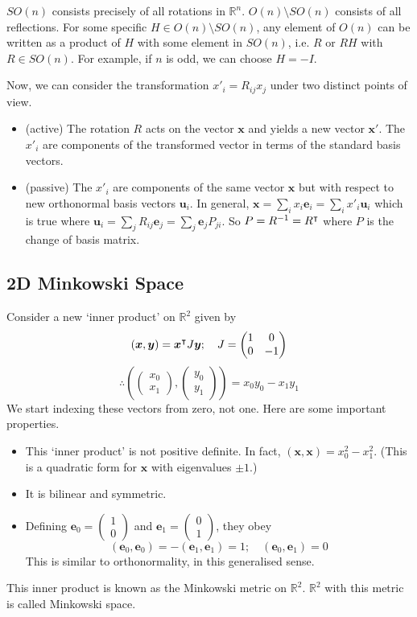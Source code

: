 \documentclass{article}
\begin{document}
	$SO(n)$ consists precisely of all rotations in $\mathbb R^n$. $O(n) \setminus SO(n)$ consists of all reflections. For some specific $H \in O(n) \setminus SO(n)$, any element of $O(n)$ can be written as a product of $H$ with some element in $SO(n)$, i.e. $R$ or $RH$ with $R \in SO(n)$. For example, if $n$ is odd, we can choose $H = -I$.

	Now, we can consider the transformation $x'_i = R_{ij} x_j$ under two distinct points of view.
	\begin{itemize}
		\item (active) The rotation $R$ acts on the vector $\bm x$ and yields a new vector $\bm x'$. The $x'_i$ are components of the transformed vector in terms of the standard basis vectors.
		\item (passive) The $x'_i$ are components of the same vector $\bm x$ but with respect to new orthonormal basis vectors $\bm u_i$. In general, $\bm x = \sum_i x_i \bm e_i = \sum_i x'_i \bm u_i$ which is true where $\bm u_i = \sum_j R_{ij} \bm e_j = \sum_j \bm e_j P_{ji}$. So $P = R^{-1} = R^\intercal$ where $P$ is the change of basis matrix.
	\end{itemize}

	\subsection{2D Minkowski Space}
	Consider a new `inner product' on $\mathbb R^2$ given by
	\[ (\bm x, \bm y) = \bm x^\intercal J \bm y;\quad J = \begin{pmatrix}
		1 & 0 \\ 0 & -1
	\end{pmatrix} \]
	\[ \therefore \left( \begin{pmatrix}
		x_0 \\ x_1
	\end{pmatrix}, \begin{pmatrix}
		y_0 \\ y_1
	\end{pmatrix} \right) = x_0 y_0 - x_1 y_1 \]
	We start indexing these vectors from zero, not one. Here are some important properties.
	\begin{itemize}
		\item This `inner product' is not positive definite. In fact, $(\bm x, \bm x) = x_0^2 - x_1^2$. (This is a  quadratic form for $\bm x$ with eigenvalues $\pm 1$.)
		\item It is bilinear and symmetric.
		\item Defining $\bm e_0 = \begin{pmatrix}
			1 \\ 0
		\end{pmatrix}$ and $\bm e_1 = \begin{pmatrix}
			0 \\ 1
		\end{pmatrix}$, they obey
		\[ (\bm e_0, \bm e_0) = -(\bm e_1, \bm e_1) = 1;\quad (\bm e_0, \bm e_1) = 0 \]
		This is similar to orthonormality, in this generalised sense.
	\end{itemize}
	This inner product is known as the Minkowski metric on $\mathbb R^2$. $\mathbb R^2$ with this metric is called Minkowski space.
\end{document}
